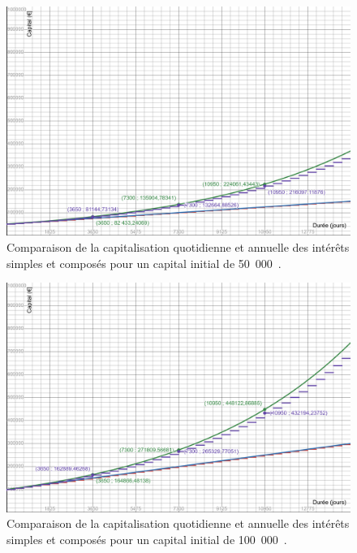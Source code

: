 \documentclass{article}
\begin{document}
\begin{enumerate}[label=\textbf{R2.\arabic*}]
                \begin{figure}[h!]
                    \centering
                    \includegraphics[width=\textwidth]{assets/img/compound_interets_50k.png}
                    \caption{Comparaison de la capitalisation quotidienne et annuelle des intérêts simples et composés pour un capital initial de 50\ 000\ .}
                    \label{fig:compound_interets_50k}
                \end{figure}
                
                \begin{figure}[h!]
                    \centering
                    \includegraphics[width=\textwidth]{assets/img/compound_interets_100k.png}
                    \caption{Comparaison de la capitalisation quotidienne et annuelle des intérêts simples et composés pour un capital initial de 100\ 000\ .}
                    \label{fig:compound_interets_100k}
                \end{figure}
                

\end{enumerate}
\end{document}
